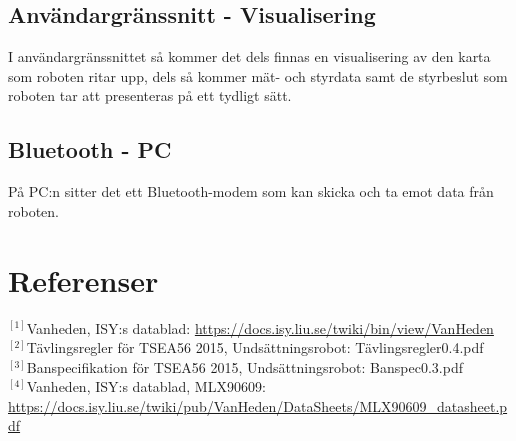 \documentclass[11pt]{article}
\begin{document}
\begin{flushleft}
\subsection{Användargränssnitt - Visualisering}
I användargränssnittet så kommer det dels finnas en visualisering av den karta som roboten ritar upp, dels så kommer mät- och styrdata samt de styrbeslut som roboten tar att presenteras på ett tydligt sätt.

\subsection{Bluetooth - PC}
På PC:n sitter det ett Bluetooth-modem som kan skicka och ta emot data från roboten.  


\setcounter{secnumdepth}{0}
\pagebreak
\section{Referenser}


$^{[1]}$Vanheden, ISY:s datablad: \url{https://docs.isy.liu.se/twiki/bin/view/VanHeden} \\[0.1in]

$^{[2]}$Tävlingsregler för TSEA56 2015, Undsättningsrobot: Tävlingsregler0.4.pdf \\[0.1in]

$^{[3]}$Banspecifikation för TSEA56 2015, Undsättningsrobot: Banspec0.3.pdf \\[0.1in]

$^{[4]}$Vanheden, ISY:s datablad, MLX90609: \url{https://docs.isy.liu.se/twiki/pub/VanHeden/DataSheets/MLX90609_datasheet.pdf} \\[0.1in]


\setcounter{secnumdepth}{2}



\end{flushleft}
\end{document}
